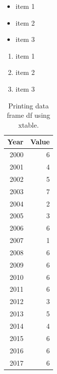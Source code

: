 \documentclass{article}
\begin{document}
\begin{itemize}
	\item item 1
	\item item 2
	\item item 3
\end{itemize}

\begin{enumerate}
	\item item 1
	\item item 2
	\item item 3
\end{enumerate}






\begin{table}[ht]
	\centering
	\begin{tabular}{rr}
		\hline
		Year & Value \\
		\hline
		2000 & 6 \\
		2001 & 4 \\
		2002 & 5 \\
		2003 & 7 \\
		2004 & 2 \\
		2005 & 3 \\
		2006 & 6 \\
		2007 & 1 \\
		2008 & 6 \\
		2009 & 6 \\
		2010 & 6 \\
		2011 & 6 \\
		2012 & 3 \\
		2013 & 5 \\
		2014 & 4 \\
		2015 & 6 \\
		2016 & 6 \\
		\hline
		2017 & 6 \\
	\end{tabular}
	\caption{Printing data frame df using xtable.}
	\label{Table:df}
\end{table}
\end{document}

